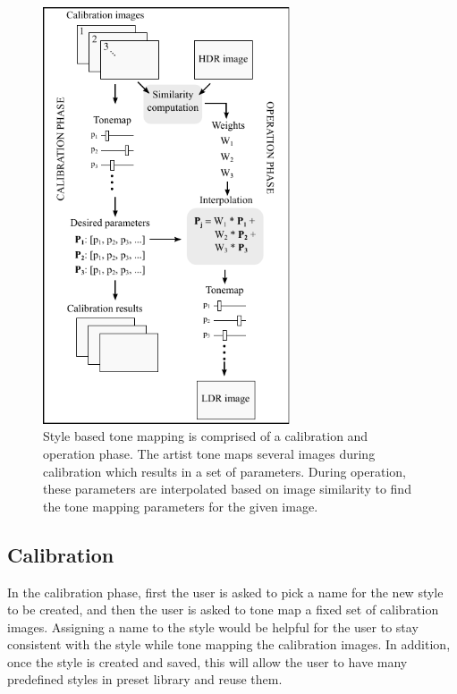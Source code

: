 \begin{figure}
\begin{center}
\includegraphics[width=0.65\textwidth]{figures/chapter5/algorithm.pdf}
\caption{Style based tone mapping is comprised of a calibration and operation phase. The artist tone maps several images during calibration which results in a set of parameters. During operation, these parameters are interpolated based on image similarity to find the tone mapping parameters for the given image.}
\label{fig:calibration_operation}
\end{center}
\end{figure}

\subsection{Calibration}
In the calibration phase, first the user is asked to pick a name for the new style to be created, and then the user is asked to tone map a fixed set of calibration images. Assigning a name to the style would be helpful for the user to stay consistent with the style while tone mapping the calibration images. In addition, once the style is created and saved, this will allow the user to have many predefined styles in preset library and reuse them. 

